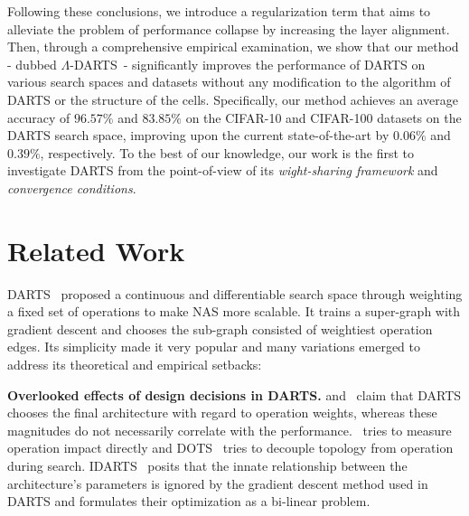 \documentclass{article} \usepackage{fancyhdr, iclr2023_conference, times}
\newcommand{\mydarts}{$\Lambda$-DARTS\xspace}
\newcommand{\lambdafn}{layer alignment\xspace}
\begin{document}
\par Following these conclusions, we introduce a regularization term that aims to alleviate the problem of performance collapse by increasing the \lambdafn. 
Then, through a comprehensive empirical examination, we show that our method - dubbed \mydarts~- significantly improves the performance of DARTS on various search spaces and datasets without any modification to the algorithm of DARTS or the structure of the cells. Specifically, our method achieves an average accuracy of $96.57\%$ and $83.85\%$ on the CIFAR-10 and CIFAR-100 datasets on the DARTS search space, improving upon the current state-of-the-art by $0.06\%$ and $0.39\%$, respectively. To the best of our knowledge, our work is the first to investigate DARTS from the point-of-view of its \textit{wight-sharing framework} and \textit{convergence conditions}.


\section{Related Work}
DARTS~\citep{DBLP:conf/iclr/LiuSY19} proposed a continuous and differentiable search space through weighting a fixed set of operations to make NAS more scalable. It trains a super-graph with gradient descent and chooses the sub-graph consisted of weightiest operation edges. Its simplicity made it very popular and many variations emerged to address its theoretical and empirical setbacks:

\textbf{Overlooked effects of design decisions in DARTS.}
\citep{DBLP:conf/iclr/WangCCTH21} and~\citep{DBLP:conf/cvpr/GuW0YWLC21} claim that DARTS chooses the final architecture with regard to operation weights, whereas these magnitudes do not necessarily correlate with the performance.~\citep{DBLP:conf/iclr/WangCCTH21} tries to measure operation impact directly and DOTS~\citep{DBLP:conf/cvpr/GuW0YWLC21} tries to decouple topology from operation during search. IDARTS~\citep{DBLP:conf/iccv/XueW0WGD21} posits that the innate relationship between the architecture’s parameters is ignored by the gradient descent method used in DARTS and formulates their optimization as a bi-linear problem.
\end{document}
